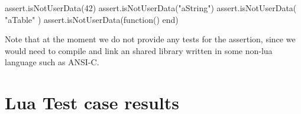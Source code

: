 \startLuaTest
  assert.isNotUserData(42)
  assert.isNotUserData("aString")
  assert.isNotUserData({ "aTable" })
  assert.isNotUserData(function() end)
\stopLuaTest
\stopTestCase

\godown[2ex]
Note that at the moment we do not provide any  tests for 
the  assertion, since we would need to compile 
and link an shared library written in some non-lua language such as 
ANSI-C. 

\stopTestSuite

\section{Lua Test case results}

\reportLuaStats

\reportFailures

\stopchapter